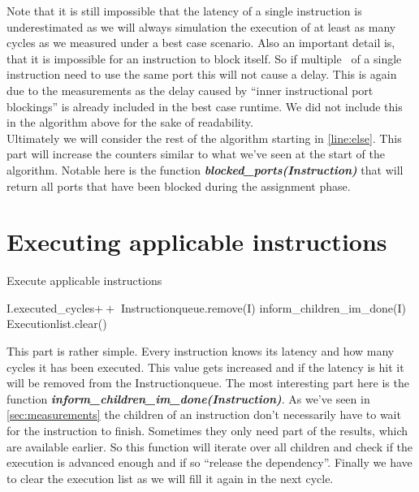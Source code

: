 Note that it is still impossible that the latency of a single instruction is underestimated as we will always simulation the execution of at least as many cycles as we measured under a best case scenario. Also an important detail is, that it is impossible for an instruction to block itself. So if multiple \microops\ of a single instruction need to use the same port this will not cause a delay. This is again due to the measurements as the delay caused by ``inner instructional port blockings'' is already included in the best case runtime. We did not include this in the algorithm above for the sake of readability.\\

Ultimately we will consider the rest of the algorithm starting in \autoref{line:else}. This part will increase the counters similar to what we've seen at the start of the algorithm. Notable here is the function \textbf{\emph{blocked\_ports(Instruction)}} that will return all ports that have been blocked during the assignment phase.



\section{Executing applicable instructions}
\label{sec:execute}

\begin{algorithm}[H]
    \SetAlgoLined
    \caption{Execute applicable instructions}
     {
        I.executed\_cycles$++$\;
         {
            Instructionqueue.remove(I)\;
        }
        inform\_children\_im\_done(I)\;
    }
    Executionlist.clear()\;
\end{algorithm}

This part is rather simple. Every instruction knows its latency and how many cycles it has been executed. This value gets increased and if the latency is hit it will be removed from the Instructionqueue. The most interesting part here is the function \textbf{\emph{inform\_children\_im\_done(Instruction)}}. As we've seen in \autoref{sec:measurements} the children of an instruction don't necessarily have to wait for the instruction to finish. Sometimes they only need part of the results, which are available earlier. So this function will iterate over all children and check if the execution is advanced enough and if so ``release the dependency''. Finally we have to clear the execution list as we will fill it again in the next cycle.

